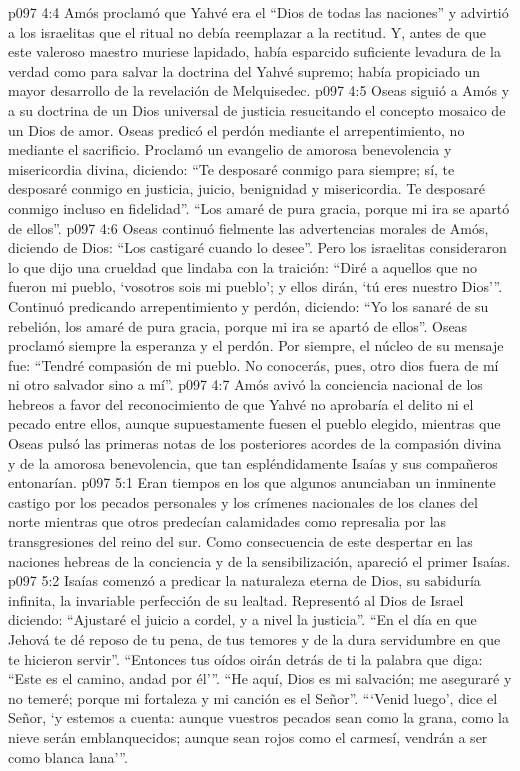 \vs p097 4:4 Amós proclamó que Yahvé era el “Dios de todas las naciones” y advirtió a los israelitas que el ritual no debía reemplazar a la rectitud. Y, antes de que este valeroso maestro muriese lapidado, había esparcido suficiente levadura de la verdad como para salvar la doctrina del Yahvé supremo; había propiciado un mayor desarrollo de la revelación de Melquisedec.
\vs p097 4:5 \pc Oseas siguió a Amós y a su doctrina de un Dios universal de justicia resucitando el concepto mosaico de un Dios de amor. Oseas predicó el perdón mediante el arrepentimiento, no mediante el sacrificio. Proclamó un evangelio de amorosa benevolencia y misericordia divina, diciendo: “Te desposaré conmigo para siempre; sí, te desposaré conmigo en justicia, juicio, benignidad y misericordia. Te desposaré conmigo incluso en fidelidad”. “Los amaré de pura gracia, porque mi ira se apartó de ellos”.
\vs p097 4:6 Oseas continuó fielmente las advertencias morales de Amós, diciendo de Dios: “Los castigaré cuando lo desee”. Pero los israelitas consideraron lo que dijo una crueldad que lindaba con la traición: “Diré a aquellos que no fueron mi pueblo, ‘vosotros sois mi pueblo'; y ellos dirán, ‘tú eres nuestro Dios'”. Continuó predicando arrepentimiento y perdón, diciendo: “Yo los sanaré de su rebelión, los amaré de pura gracia, porque mi ira se apartó de ellos”. Oseas proclamó siempre la esperanza y el perdón. Por siempre, el núcleo de su mensaje fue: “Tendré compasión de mi pueblo. No conocerás, pues, otro dios fuera de mí ni otro salvador sino a mí”.
\vs p097 4:7 \pc Amós avivó la conciencia nacional de los hebreos a favor del reconocimiento de que Yahvé no aprobaría el delito ni el pecado entre ellos, aunque supuestamente fuesen el pueblo elegido, mientras que Oseas pulsó las primeras notas de los posteriores acordes de la compasión divina y de la amorosa benevolencia, que tan espléndidamente Isaías y sus compañeros entonarían.
\vs p097 5:1 Eran tiempos en los que algunos anunciaban un inminente castigo por los pecados personales y los crímenes nacionales de los clanes del norte mientras que otros predecían calamidades como represalia por las transgresiones del reino del sur. Como consecuencia de este despertar en las naciones hebreas de la conciencia y de la sensibilización, apareció el primer Isaías.
\vs p097 5:2 Isaías comenzó a predicar la naturaleza eterna de Dios, su sabiduría infinita, la invariable perfección de su lealtad. Representó al Dios de Israel diciendo: “Ajustaré el juicio a cordel, y a nivel la justicia”. “En el día en que Jehová te dé reposo de tu pena, de tus temores y de la dura servidumbre en que te hicieron servir”. “Entonces tus oídos oirán detrás de ti la palabra que diga: “Este es el camino, andad por él'”. “He aquí, Dios es mi salvación; me aseguraré y no temeré; porque mi fortaleza y mi canción es el Señor”. “‘Venid luego’, dice el Señor, ‘y estemos a cuenta: aunque vuestros pecados sean como la grana, como la nieve serán emblanquecidos; aunque sean rojos como el carmesí, vendrán a ser como blanca lana’”.
